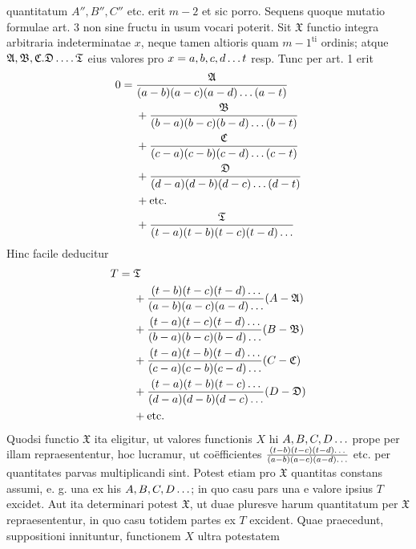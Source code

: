 quantitatum $A'',B'',C''$ etc. erit $m-2$ et sic porro.
Sequens quoque mutatio formulae art. 3 non sine fructu in usum vocari
poterit. Sit $\mathfrak{X}$ functio integra arbitraria indeterminatae $x$, neque tamen altioris
quam $m-1^{\mathrm{ti}}$ ordinis; atque $\mathfrak{A},\mathfrak{B},\mathfrak{C}.\mathfrak{D}\mathinner{.\,.\,.\,.}\mathfrak{T}$ eius valores pro $x=a,b,c,d\mathinner{.\,.\,.}t$
resp. Tunc per art. 1 erit
\[
\begin{aligned}
0={}&\frac{\mathfrak{A}}{(a-b)(a-c)(a-d)\mathinner{.\,.\,.}(a-t)}\\
&{}+\frac{\mathfrak{B}}{(b-a)(b-c)(b-d)\mathinner{.\,.\,.}(b-t)}\\
&{}+\frac{\mathfrak{C}}{(c-a)(c-b)(c-d)\mathinner{.\,.\,.}(c-t)}\\
&{}+\frac{\mathfrak{D}}{(d-a)(d-b)(d-c)\mathinner{.\,.\,.}(d-t)}\\
&{}+\text{etc.}\\
&{}+\frac{\mathfrak{T}}{(t-a)(t-b)(t-c)(t-d)\mathinner{.\,.\,.}}
\end{aligned}
\]
Hinc facile deducitur
\[
\begin{aligned}
T={}&\mathfrak{T}\\
&{}+\frac{(t-b)(t-c)(t-d)\mathinner{.\,.\,.}}{(a-b)(a-c)(a-d)\mathinner{.\,.\,.}}(A-\mathfrak{A})\\
&{}+\frac{(t-a)(t-c)(t-d)\mathinner{.\,.\,.}}{(b-a)(b-c)(b-d)\mathinner{.\,.\,.}}(B-\mathfrak{B})\\
&{}+\frac{(t-a)(t-b)(t-d)\mathinner{.\,.\,.}}{(c-a)(c-b)(c-d)\mathinner{.\,.\,.}}(C-\mathfrak{C})\\
&{}+\frac{(t-a)(t-b)(t-c)\mathinner{.\,.\,.}}{(d-a)(d-b)(d-c)\mathinner{.\,.\,.}}(D-\mathfrak{D})\\
&{}+\text{etc.}
\end{aligned}
\]
Quodsi functio $\mathfrak{X}$ ita eligitur, ut valores functionis $X$ hi $A,B,C,D\mathinner{.\,.\,.}$ prope
per illam repraesententur, hoc lucramur, ut coëfficientes
$\frac{(t-b)(t-c)(t-d)\mathinner{.\,.\,.}}{(a-b)(a-c)(a-d)\mathinner{.\,.\,.}}$ etc.
per quantitates parvas multiplicandi sint. Potest etiam pro $\mathfrak{X}$ quantitas constans
assumi, e. g. una ex his $A,B,C,D\mathinner{.\,.\,.}$; in quo casu pars una e valore ipsius
$T$ excidet. Aut ita determinari potest $\mathfrak{X}$, ut duae pluresve harum quantitatum
per $\mathfrak{X}$ repraesententur, in quo casu totidem partes ex $T$ excident.
Quae praecedunt, suppositioni innituntur, functionem $X$ ultra potestatem
